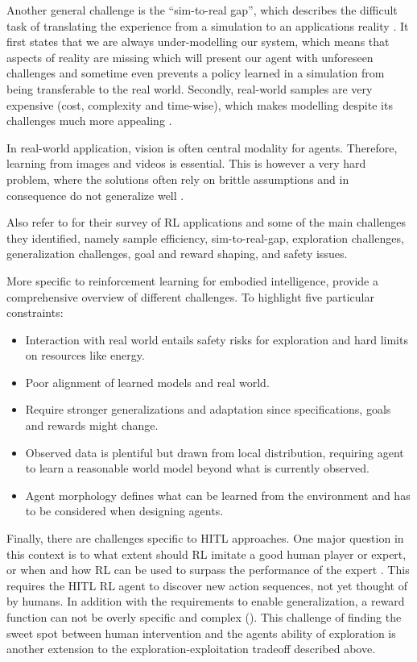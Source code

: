 \documentclass[twoside,11pt]{article}
\begin{document}
Another general challenge is the ``sim-to-real gap'', which describes the difficult task of translating the experience from a simulation to an applications reality \citep{ZagalJavierVallejos:2004:RealityGap}. It first states that we are always under-modelling our system, which means that aspects of reality are missing which will present our agent with unforeseen challenges and sometime even prevents a policy learned in a simulation from being transferable to the real world. Secondly, real-world samples are very expensive (cost, complexity and time-wise), which makes modelling despite its challenges much more appealing  \citep{KoberBagnellPeters:2013:RLRoboticsSurvey}.

In real-world application, vision is often central modality for agents. Therefore, learning from images and videos is essential. This is however a very hard problem, where the solutions often rely on brittle assumptions and in consequence do not generalize well \citep{TomarEtAl:2021:LearnPixelControlRepresentations}. 

Also refer to \citet{ibarz2021train} for their survey of RL applications and some of the main challenges they identified, namely sample efficiency, sim-to-real-gap, exploration challenges, generalization challenges, goal and reward shaping, and safety issues. 

More specific to reinforcement learning for embodied intelligence, \citet{RoyEtAl:2021:RLRoboticsChallenges} provide a comprehensive overview of different challenges. To highlight five particular constraints:
\begin{itemize}
    \item Interaction with real world entails safety risks for exploration and hard limits on resources like energy.
    \item Poor alignment of learned models and real world.
    \item Require stronger generalizations  and adaptation since specifications, goals and rewards might change.
    \item Observed data is plentiful but drawn from local distribution, requiring agent to learn a reasonable world model beyond  what is currently observed. 
    \item Agent morphology defines what can be learned from the environment and has to be considered when designing agents.
\end{itemize}

Finally, there are challenges specific to HITL approaches. One major question in this context is to what extent should RL imitate a good human player or expert, or when and how RL can be used to surpass the performance of the expert \citep{Abel:2017:AgentAgnosticHumanInTheLoopRL}. This requires the HITL RL agent to discover new action sequences, not yet thought of by humans. In addition with the requirements to enable generalization, a reward function can not be overly specific and complex (\citep{LiuAbbeel:2020:UnsupervisedActivePreTraining}). This challenge of finding the sweet spot between human intervention and the agents ability of exploration is another extension to the exploration-exploitation tradeoff described above. 
\end{document}
